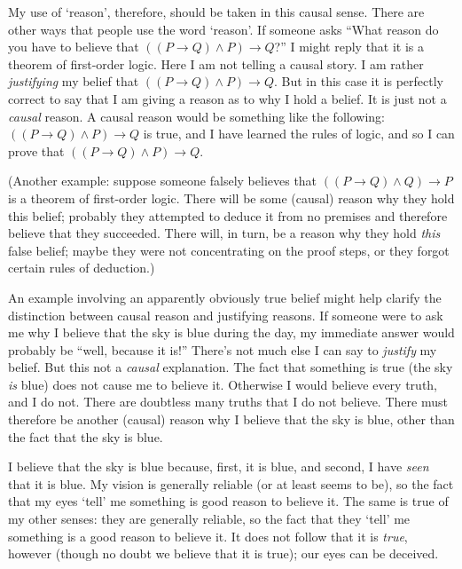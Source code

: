 \documentclass[11pt]{article}
\begin{document}
\begin{spacing}{1.5}
My use of `reason', therefore, should be taken in this causal sense.
There are other ways that people use the word `reason'.  If someone
asks ``What reason do you have to believe that $((P \rightarrow Q )
\wedge P) \rightarrow Q$?''  I might reply that it is a theorem of
first-order logic.  Here I am not telling a causal story.  I am rather
{\em justifying} my belief that $((P \rightarrow Q ) \wedge P)
\rightarrow Q$.  But in this case it is perfectly correct to say that
I am giving a reason as to why I hold a belief.  It is just not a {\em
  causal} reason.  A causal reason would be something like the
following: $((P \rightarrow Q ) \wedge P) \rightarrow Q$ is true, and
I have learned the rules of logic, and so I can prove that $((P
\rightarrow Q ) \wedge P) \rightarrow Q$.

(Another example: suppose someone falsely believes that $((P
\rightarrow Q ) \wedge Q) \rightarrow P$ is a theorem of first-order
logic.  There will be some (causal) reason why they hold this belief;
probably they attempted to deduce it from no premises and therefore
believe that they succeeded.  There will, in turn, be a reason why
they hold {\em this} false belief; maybe they were not concentrating
on the proof steps, or they forgot certain rules of deduction.)

An example involving an apparently obviously true belief might help
clarify the distinction between causal reason and justifying reasons.
If someone were to ask me why I believe that the sky is blue during
the day, my immediate answer would probably be ``well, because it
is!''  There's not much else I can say to {\em justify} my belief.
But this not a {\em causal} explanation.  The fact that something is
true (the sky {\em is} blue) does not cause me to believe it.
Otherwise I would believe every truth, and I do not.  There are
doubtless many truths that I do not believe.  There must therefore be
another (causal) reason why I believe that the sky is blue, other than
the fact that the sky is blue.

I believe that the sky is blue because, first, it is blue, and second,
I have {\em seen} that it is blue.  My vision is generally reliable
(or at least seems to be), so the fact that my eyes `tell' me
something is good reason to believe it.  The same is true of my other
senses: they are generally reliable, so the fact that they `tell' me
something is a good reason to believe it.  It does not follow that it
is {\em true}, however (though no doubt we believe that it is true);
our eyes can be deceived.


\end{spacing}
\end{document}
